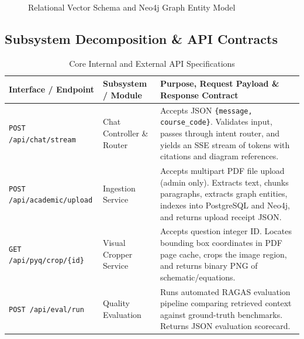 \documentclass[11pt, a4paper]{article}
\begin{document}
\begin{figure}[H]
{
    }
    \caption{Relational Vector Schema and Neo4j Graph Entity Model}
\end{figure}

\subsection{Subsystem Decomposition \& API Contracts}
\begin{table}[H]
    \centering
    \footnotesize
    \renewcommand{\arraystretch}{1.25}
    \begin{tabular}{|p{3.2cm}|p{3.5cm}|p{6.8cm}|}
        \hline
        \textbf{Interface / Endpoint} & \textbf{Subsystem / Module} & \textbf{Purpose, Request Payload \& Response Contract} \\
        \hline
        \texttt{POST /api/chat/stream} & Chat Controller \& Router & Accepts JSON \texttt{\{message, course\_code\}}. Validates input, passes through intent router, and yields an SSE stream of tokens with citations and diagram references. \\
        \hline
        \texttt{POST /api/academic/upload} & Ingestion Service & Accepts multipart PDF file upload (admin only). Extracts text, chunks paragraphs, extracts graph entities, indexes into PostgreSQL and Neo4j, and returns upload receipt JSON. \\
        \hline
        \texttt{GET /api/pyq/crop/\{id\}} & Visual Cropper Service & Accepts question integer ID. Locates bounding box coordinates in PDF page cache, crops the image region, and returns binary PNG of schematic/equations. \\
        \hline
        \texttt{POST /api/eval/run} & Quality Evaluation & Runs automated RAGAS evaluation pipeline \cite{es2024ragas} comparing retrieved context against ground-truth benchmarks. Returns JSON evaluation scorecard. \\
        \hline
    \end{tabular}
    \caption{Core Internal and External API Specifications}
\end{table}
\end{document}
